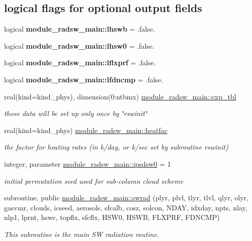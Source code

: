 \subsection*{logical flags for optional output fields}
\begin{DoxyCompactItemize}
\item 
logical {\bfseries module\+\_\+radsw\+\_\+main\+::lhswb} = .false.
\item 
logical {\bfseries module\+\_\+radsw\+\_\+main\+::lhsw0} = .false.
\item 
logical {\bfseries module\+\_\+radsw\+\_\+main\+::lflxprf} = .false.
\item 
logical {\bfseries module\+\_\+radsw\+\_\+main\+::lfdncmp} = .false.
\item 
real(kind=kind\+\_\+phys), dimension(0\+:ntbmx) \hyperlink{group__module__radsw__main_ga1f9d18b17cc24321ed1cf45254ac2b0f}{module\+\_\+radsw\+\_\+main\+::exp\+\_\+tbl}
\begin{DoxyCompactList}\small\item\em those data will be set up only once by \char`\"{}rswinit\char`\"{} \end{DoxyCompactList}\item 
real(kind=kind\+\_\+phys) \hyperlink{group__module__radsw__main_gaad60e753cdda20d4e84d063280f0dfcc}{module\+\_\+radsw\+\_\+main\+::heatfac}
\begin{DoxyCompactList}\small\item\em the factor for heating rates (in k/day, or k/sec set by subroutine \textquotesingle{}rswinit\textquotesingle{}) \end{DoxyCompactList}\item 
integer, parameter \hyperlink{group__module__radsw__main_gae1f88a0b60d69b892cfae83bb9ab67df}{module\+\_\+radsw\+\_\+main\+::ipsdsw0} = 1
\begin{DoxyCompactList}\small\item\em initial permutation seed used for sub-\/column cloud scheme \end{DoxyCompactList}\item 
subroutine, public \hyperlink{group__module__radsw__main_ga784397878835a8cdd0b14a7b9eafb4e3}{module\+\_\+radsw\+\_\+main\+::swrad} (plyr, plvl, tlyr, tlvl, qlyr, olyr, gasvmr, clouds, icseed, aerosols, sfcalb, cosz, solcon, N\+D\+AY, idxday, npts, nlay, nlp1, lprnt, hswc, topflx, sfcflx, H\+S\+W0, H\+S\+WB, F\+L\+X\+P\+RF, F\+D\+N\+C\+MP)
\begin{DoxyCompactList}\small\item\em This subroutine is the main SW radiation routine. \end{DoxyCompactList}\end{DoxyCompactItemize}
